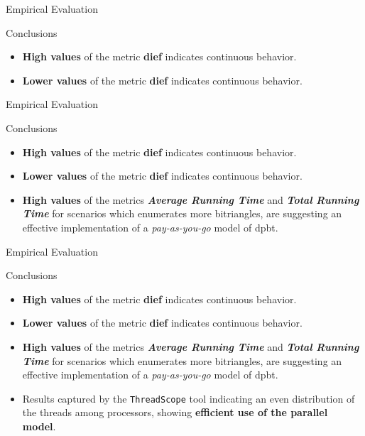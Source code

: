 \begin{frame}[fragile]{Empirical Evaluation}
  \begin{block}{Conclusions}
    \begin{itemize}
      \item {\color{light}\textbf{High values} of the metric \textbf{dief\@t} indicates continuous behavior.}
      \item \textbf{Lower values} of the metric \textbf{dief\@k} indicates continuous behavior.
    \end{itemize} 
  \end{block}
\end{frame}

\begin{frame}[fragile]{Empirical Evaluation}
  \begin{block}{Conclusions}
    \begin{itemize}
      \item {\color{light}\textbf{High values} of the metric \textbf{dief\@t} indicates continuous behavior.}
      \item {\color{light}\textbf{Lower values} of the metric \textbf{dief\@k} indicates continuous behavior.}
      \item \textbf{High values} of the metrics \textbf{\emph{Average Running Time}} and \textbf{\emph{Total Running Time}} for scenarios which enumerates more bitriangles, are suggesting an effective implementation of a \emph{pay-as-you-go} model of \acrshort{dpbt}.
    \end{itemize} 
  \end{block}
\end{frame}

\begin{frame}[fragile]{Empirical Evaluation}
  \begin{block}{Conclusions}
    \begin{itemize}
      \item {\color{light}\textbf{High values} of the metric \textbf{dief\@t} indicates continuous behavior.}
      \item {\color{light}\textbf{Lower values} of the metric \textbf{dief\@k} indicates continuous behavior.}
      \item {\color{light}\textbf{High values} of the metrics \textbf{\emph{Average Running Time}} and \textbf{\emph{Total Running Time}} for scenarios which enumerates more bitriangles, are suggesting an effective implementation of a \emph{pay-as-you-go} model of \acrshort{dpbt}.}
      \item Results captured by the \texttt{ThreadScope} tool indicating an even distribution of the threads among processors, showing \textbf{efficient use of the parallel model}.
    \end{itemize} 
  \end{block}
\end{frame}

